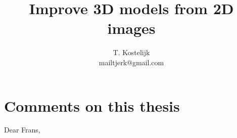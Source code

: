 



%





\title{\sc Improve 3D models from 2D images}
\author{T. Kostelijk\\mailtjerk@gmail.com}

\maketitle
\section{Comments on this thesis}
Dear Frans,

